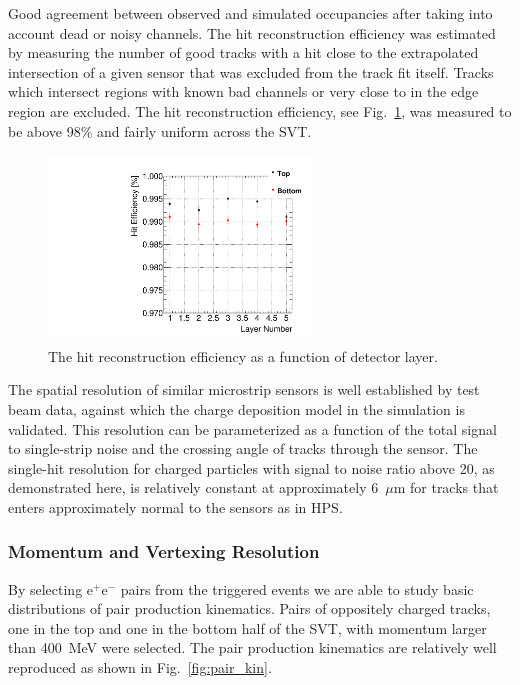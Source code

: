 \documentclass[final,3p,times,twocolumn]{elsarticle}
\newcommand{\ee}{e$^+$e$^-$}
\begin{document}
Good agreement between observed and simulated occupancies after taking into account dead or 
noisy channels. The hit reconstruction efficiency was estimated by measuring 
the number of good tracks with a hit close to the extrapolated intersection of a given sensor that was 
excluded from the track fit itself. Tracks which intersect regions with known bad channels or very close 
to in the edge region are excluded. The hit reconstruction efficiency, see Fig.~\ref{fig:hit_efficiency}, 
was measured to be above 98\% and fairly uniform across the SVT.
\begin{figure}[]
\begin{center}
{\small
    	\includegraphics[width=7cm]{figures/single_hit_efficiency_Omar_11192013.pdf}
        \caption{ The hit reconstruction efficiency as a function of detector layer.}
	\label{fig:hit_efficiency}
}
\end{center}
\end{figure}


The spatial resolution of similar microstrip sensors is well established by test beam data, against which 
the charge deposition model in the simulation is validated.  This resolution can be parameterized as a 
function of the total signal to single-strip noise and the crossing angle of tracks through the sensor.  
The single-hit resolution for charged particles with signal to noise ratio above 20, as demonstrated 
here, is relatively constant at approximately 6~$\mu$m for tracks that enters approximately normal to 
the sensors as in HPS.



\subsubsection{Momentum and Vertexing Resolution}

By selecting \ee{} pairs from the triggered events we are able to study basic distributions of pair 
production kinematics. Pairs of oppositely charged tracks, one in the top and one in the bottom half of 
the SVT, with momentum larger than 400~MeV were selected. The pair production kinematics are 
relatively well reproduced as shown in Fig.~\ref{fig:pair_kin}. 
\end{document}
